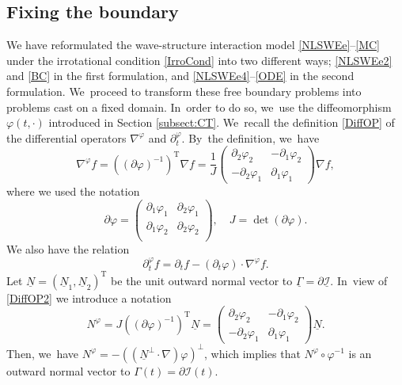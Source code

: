 \documentclass[JEP,XML,SOM,Unicode,NoFloatCountersInSection,published]{cedram}
\newcommand{\dt}{\partial_t}
\newcommand{\cI}{{\mathcal I}}
\newcommand{\ul}[1]{\underline{#1}}
\newcommand{\itGamma}{\mathit{\Gamma}}
\theoremstyle{definition}
\begin{document}
\subsection{Fixing the boundary}\label{sectfixing}
We have reformulated the wave-structure interaction model \eqref{NLSWEe}--\eqref{MC} under the irrotational condition \eqref{IrroCond} into two different ways;
\eqref{NLSWEe2} and \eqref{BC} in the first formulation, and \eqref{NLSWEe4}--\eqref{ODE} in the second formulation. We~proceed to transform these free boundary problems into problems cast on a fixed domain. In~order to do so, we~use the diffeomorphism $\varphi(t,\cdot)$ introduced in Section \ref{subsect:CT}. We~recall the definition \eqref{DiffOP} of the differential operators $\nabla^\varphi$ and $\dt^\varphi$. By~the definition, we~have
\begin{equation}\label{DiffOP2}
\nabla^\varphi f
= ((\partial\varphi)^{-1})^\mathrm{T}\nabla f
= \frac{1}{J}
\begin{pmatrix}
\partial_2\varphi_2 & -\partial_1\varphi_2 \\
-\partial_2\varphi_1 & \partial_1\varphi_1
\end{pmatrix}
\nabla f,
\end{equation}
where we used the notation
\[
\partial\varphi
= \begin{pmatrix}
\partial_1\varphi_1 & \partial_2\varphi_1 \\
\partial_1\varphi_2 & \partial_2\varphi_2 \\
\end{pmatrix}, \quad
J = \det(\partial\varphi).
\]
We also have the relation
\begin{equation}\label{DiffOP3}
\dt^\varphi f = \dt f - (\dt \varphi)\cdot\nabla^\varphi f.
\end{equation}
Let $\ul{N} = (\ul{N}_1,\ul{N}_2)^\mathrm{T}$ be the unit outward normal vector to $\ul{\itGamma}=\partial\ul{\cI}$. In~view of \eqref{DiffOP2} we introduce a notation
\begin{equation}\label{Nphi}
N^\varphi = J((\partial\varphi)^{-1})^\mathrm{T}\ul{N} =
\begin{pmatrix}
\partial_2\varphi_2 & -\partial_1\varphi_2 \\
-\partial_2\varphi_1 & \partial_1\varphi_1
\end{pmatrix}
\ul{N}.
\end{equation}
Then, we~have $N^\varphi = -((\ul{N}^{\perp}\cdot\nabla)\varphi)^\perp$,
which implies that $N^\varphi\circ\varphi^{-1}$ is an outward normal vector to $\itGamma(t)= \partial\cI(t)$.
\end{document}
